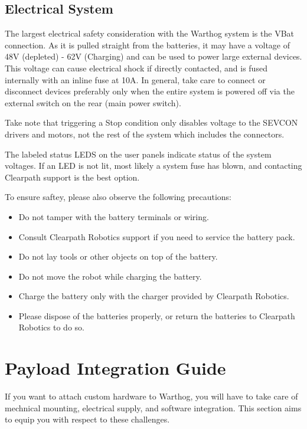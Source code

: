 \documentclass[]{clearpath-latex/clearpath-manual}
\begin{document}
\subsection{Electrical System}

The largest electrical safety consideration with the Warthog system is the VBat connection. As it is pulled straight from the batteries, it may have a voltage of 48V (depleted) - 62V (Charging) and can be used to power large external devices. This voltage can cause electrical shock if directly contacted, and is fused internally with an inline fuse at 10A. In general, take care to connect or disconnect devices preferably only when the entire system is powered off via the external switch on the rear (main power switch).

Take note that triggering a Stop condition only disables voltage to the SEVCON drivers and motors, not the rest of the system which includes the connectors.

The labeled status LEDS on the user panels indicate status of the system voltages. If an LED is not lit, most likely a system fuse has blown, and contacting Clearpath support is the best option.

To ensure saftey, please also observe the following precautions:

\begin{itemize}[nolistsep]
  \item Do not tamper with the battery terminals or wiring.
  \item Consult Clearpath Robotics support if you need to service the battery pack.
  \item Do not lay tools or other objects on top of the battery.
  \item Do not move the robot while charging the battery.
  \item Charge the battery only with the charger provided by Clearpath Robotics.
  \item Please dispose of the batteries properly, or return the batteries to Clearpath Robotics to do so.
\end{itemize}


\section{Payload Integration Guide}

If you want to attach custom hardware to Warthog, you will have to take care of mechnical mounting, electrical supply, and software integration.  This section aims to equip you with respect to these challenges.
\end{document}
